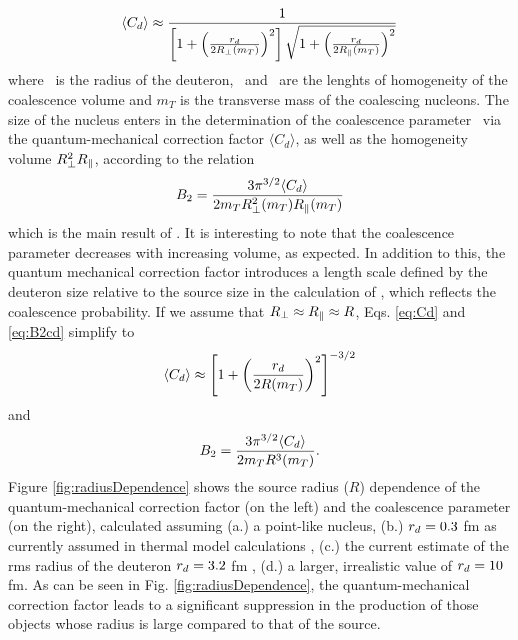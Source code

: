 \documentclass[a4paper,11pt]{scrartcl} %
\begin{document}
\begin{equation}
\langle C_{d} \rangle \approx \frac{1}{\left[1+ \left(\frac{r_{d}}{2R_{\perp}(m_{T})}\right)^{2}\right] \sqrt{1+ \left(\frac{r_{d}}{2R_{\|}(m_{T})}\right)^{2}}}
\label{eq:Cd}
\end{equation}
%
where \dradius~is the radius of the deuteron, \rperp~and \rpar~are the lenghts of homogeneity of the coalescence volume and $m_{T}$ is the transverse mass of the coalescing nucleons.
The size of the nucleus enters in the determination of the coalescence parameter \btwo~via the quantum-mechanical correction factor $\langle C_{d} \rangle$, as well as the homogeneity volume $R_{\perp}^{2}R_{\|}$, according to the relation
%
\begin{equation}
B_{2} = \frac{3\pi^{3/2} \langle C_{d} \rangle}{2m_{T}R_{\perp}^{2}(m_{T})R_{\|}(m_{T})}
\label{eq:B2cd}
\end{equation}
%
which is the main result of \cite{Scheibl:1998tk}. It is interesting to note that the coalescence parameter decreases with increasing volume, as expected. In addition to this, the quantum mechanical correction factor introduces a length scale defined by the deuteron size relative to the source size in the calculation of \btwo, which reflects the coalescence probability. 
If we assume that  $R_{\perp} \approx R_{\|} \approx R$, Eqs. \ref{eq:Cd} and \ref{eq:B2cd} simplify to 
\begin{equation}
\langle C_{d} \rangle \approx \left[1+ \left(\frac{r_{d}}{2R(m_{T})}\right)^{2}\right]^{-3/2}
\label{eq:Cdapprox}
\end{equation}
%
and
%
\begin{equation}
B_{2} = \frac{3\pi^{3/2} \langle C_{d} \rangle}{2m_{T}R^{3}(m_{T})}.
\label{eq:B2approx}
\end{equation}
%
Figure \ref{fig:radiusDependence} shows the source radius ($R$) dependence of the quantum-mechanical correction factor (on the left) and the coalescence parameter \btwo (on the right), calculated assuming (a.) a point-like nucleus, (b.) $r_{d} = 0.3$ fm as currently assumed in thermal model calculations \cite{Andronic:2016nof}, (c.) the current estimate of the rms radius of the deuteron $r_{d} = 3.2$ fm \cite{Mohr:2015ccw}, (d.) a larger, irrealistic value of  $r_{d} = 10$ fm. 
As can be seen in Fig. \ref{fig:radiusDependence}, the quantum-mechanical correction factor leads to a significant suppression in the production of those objects whose radius is large compared to that of the source.
\end{document}
